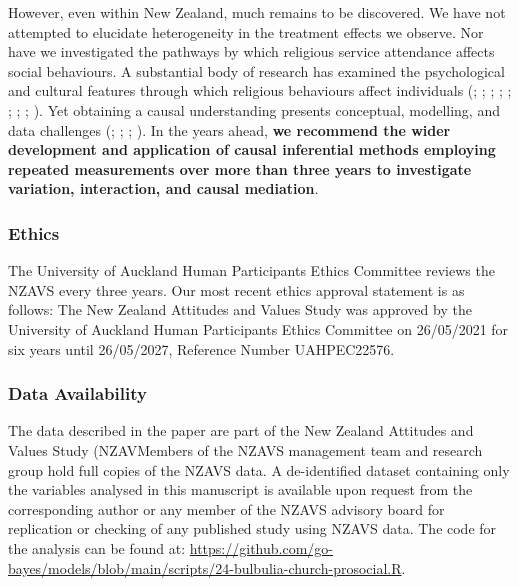 \documentclass[
  single column]{article}
\begin{document}
However, even within New Zealand, much remains to be discovered. We have
not attempted to elucidate heterogeneity in the treatment effects we
observe. Nor have we investigated the pathways by which religious
service attendance affects social behaviours. A substantial body of
research has examined the psychological and cultural features through
which religious behaviours affect individuals
(;
;
;
;
;
;
;
;
). Yet obtaining a causal
understanding presents conceptual, modelling, and data challenges
(;
;
;
). In the years
ahead, \textbf{we recommend the wider development and application of
causal inferential methods employing repeated measurements over more
than three years to investigate variation, interaction, and causal
mediation}.

\newpage{}

\subsubsection{Ethics}\label{ethics}

The University of Auckland Human Participants Ethics Committee reviews
the NZAVS every three years. Our most recent ethics approval statement
is as follows: The New Zealand Attitudes and Values Study was approved
by the University of Auckland Human Participants Ethics Committee on
26/05/2021 for six years until 26/05/2027, Reference Number UAHPEC22576.

\subsubsection{Data Availability}\label{data-availability}

The data described in the paper are part of the New Zealand Attitudes
and Values Study (NZAVMembers of the NZAVS management team and research
group hold full copies of the NZAVS data. A de-identified dataset
containing only the variables analysed in this manuscript is available
upon request from the corresponding author or any member of the NZAVS
advisory board for replication or checking of any published study using
NZAVS data. The code for the analysis can be found at:
\url{https://github.com/go-bayes/models/blob/main/scripts/24-bulbulia-church-prosocial.R}.
\end{document}
